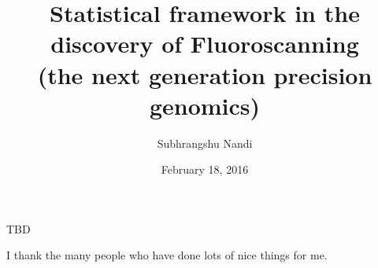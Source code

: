 

\clearpage{}  %


\title{Statistical framework in the discovery of Fluoroscanning \\ (the next generation precision genomics)}
\author{Subhrangshu Nandi}
\date{February 18, 2016}
\prelim
\maketitle

\copyrightpage

\begin{dedication}
TBD
\end{dedication}

\begin{acknowledgments}
I thank the many people who have done lots of nice things for me.
\end{acknowledgments}

\tableofcontents
\listoftables
\listoffigures

